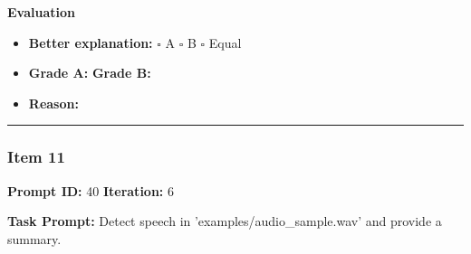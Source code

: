 \documentclass[11pt]{article}
\begin{document}
\textbf{Evaluation}
\begin{itemize}
    \item \textbf{Better explanation:} \hspace{1em} $\square$ A \hspace{1em} $\square$ B \hspace{1em} $\square$ Equal
    \item \textbf{Grade A:} \underline{\hspace{2cm}} \hspace{1em} \textbf{Grade B:} \underline{\hspace{2cm}}
    \item \textbf{Reason:} \\[4.5em]
\end{itemize}

\vspace{1em}
\hrule
\vspace{1em}


\subsubsection*{Item 11}
\textbf{Prompt ID:} 40 \hfill \textbf{Iteration:} 6

\textbf{Task Prompt:} Detect speech in 'examples/audio\_sample.wav' and provide a summary.
\end{document}
